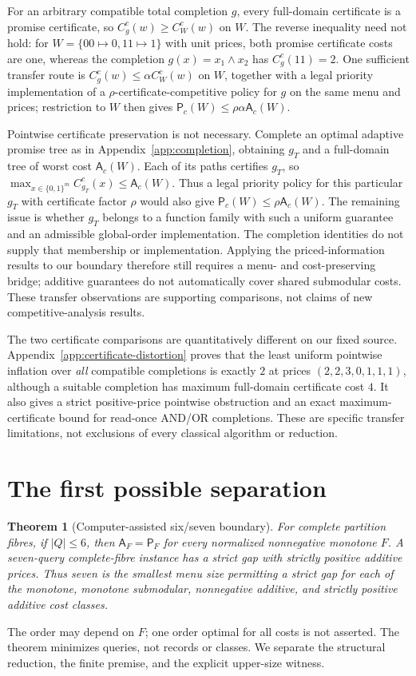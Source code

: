 \documentclass[pdflatex,sn-mathphys-num]{sn-jnl}
\newcommand{\A}{\mathsf{A}}
\newcommand{\Pcost}{\mathsf{P}}
\theoremstyle{thmstyleone}
\newtheorem{theorem}{Theorem}
\theoremstyle{thmstylethree}
\theoremstyle{thmstyletwo}
\begin{document}
For an arbitrary compatible total completion $g$, every full-domain certificate is a promise certificate, so $C_g^c(w)\geq C_W^c(w)$ on $W$. The reverse inequality need not hold: for $W=\{00\mapsto0,11\mapsto1\}$ with unit prices, both promise certificate costs are one, whereas the completion $g(x)=x_1\wedge x_2$ has $C_g^c(11)=2$. One sufficient transfer route is $C_g^c(w)\leq\alpha C_W^c(w)$ on $W$, together with a legal priority implementation of a $\rho$-certificate-competitive policy for $g$ on the same menu and prices; restriction to $W$ then gives $\Pcost_c(W)\leq\rho\alpha\A_c(W)$.

Pointwise certificate preservation is not necessary. Complete an optimal adaptive promise tree as in Appendix~\ref{app:completion}, obtaining $g_T$ and a full-domain tree of worst cost $\A_c(W)$. Each of its paths certifies $g_T$, so $\max_{x\in\{0,1\}^m}C_{g_T}^c(x)\leq\A_c(W)$. Thus a legal priority policy for this particular $g_T$ with certificate factor $\rho$ would also give $\Pcost_c(W)\leq\rho\A_c(W)$. The remaining issue is whether $g_T$ belongs to a function family with such a uniform guarantee and an admissible global-order implementation. The completion identities do not supply that membership or implementation. Applying the priced-information results to our boundary therefore still requires a menu- and cost-preserving bridge; additive guarantees do not automatically cover shared submodular costs. These transfer observations are supporting comparisons, not claims of new competitive-analysis results.

The two certificate comparisons are quantitatively different on our fixed source. Appendix~\ref{app:certificate-distortion} proves that the least uniform pointwise inflation over \emph{all} compatible completions is exactly $2$ at prices $(2,2,3,0,1,1,1)$, although a suitable completion has maximum full-domain certificate cost $4$. It also gives a strict positive-price pointwise obstruction and an exact maximum-certificate bound for read-once AND/OR completions. These are specific transfer limitations, not exclusions of every classical algorithm or reduction.


\section{The first possible separation}
\begin{theorem}[Computer-assisted six/seven boundary]\label{thm:boundary}
For complete partition fibres, if $|Q|\leq6$, then $\A_F=\Pcost_F$ for every normalized nonnegative monotone $F$. A seven-query complete-fibre instance has a strict gap with strictly positive additive prices. Thus seven is the smallest menu size permitting a strict gap for each of the monotone, monotone submodular, nonnegative additive, and strictly positive additive cost classes.
\end{theorem}
The order may depend on $F$; one order optimal for all costs is not asserted. The theorem minimizes queries, not records or classes. We separate the structural reduction, the finite premise, and the explicit upper-size witness.
\end{document}
